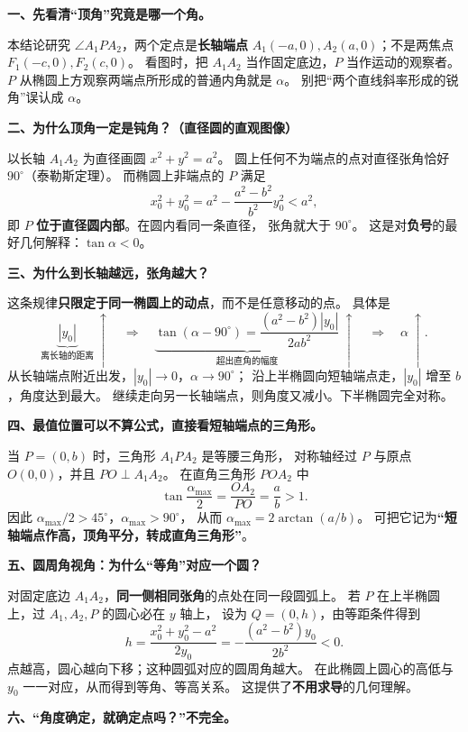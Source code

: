 \begin{explanationbox}
\textbf{一、先看清“顶角”究竟是哪一个角。}

本结论研究 $\angle A_1PA_2$，两个定点是\textbf{长轴端点}
$A_1(-a,0),A_2(a,0)$；不是两焦点 $F_1(-c,0),F_2(c,0)$。
看图时，把 $A_1A_2$ 当作固定底边，$P$ 当作运动的观察者。
$P$ 从椭圆上方观察两端点所形成的普通内角就是 $\alpha$。
别把“两个直线斜率形成的锐角”误认成 $\alpha$。

\medskip
\textbf{二、为什么顶角一定是钝角？（直径圆的直观图像）}

以长轴 $A_1A_2$ 为直径画圆 $x^2+y^2=a^2$。
圆上任何不为端点的点对直径张角恰好 $90^\circ$（泰勒斯定理）。
而椭圆上非端点的 $P$ 满足
\[
x_0^2+y_0^2=a^2-\frac{a^2-b^2}{b^2}y_0^2<a^2,
\]
即 $P$ \textbf{位于直径圆内部}。在圆内看同一条直径，
张角就大于 $90^\circ$。
这是对\textbf{负号}的最好几何解释：$\tan\alpha<0$。

\medskip
\textbf{三、为什么到长轴越远，张角越大？}

这条规律\textbf{只限定于同一椭圆上的动点}，而不是任意移动的点。
具体是
\[
\underbrace{|y_0|}_{\text{离长轴的距离}}
\ \uparrow\quad\Longrightarrow\quad
\underbrace{\tan(\alpha-90^\circ)
=\frac{(a^2-b^2)|y_0|}{2ab^2}}_{\text{超出直角的幅度}}
\ \uparrow\quad\Longrightarrow\quad\alpha\ \uparrow.
\]
从长轴端点附近出发，$|y_0|\to0$，$\alpha\to90^\circ$；
沿上半椭圆向短轴端点走，$|y_0|$ 增至 $b$，角度达到最大。
继续走向另一长轴端点，则角度又减小。下半椭圆完全对称。

\medskip
\textbf{四、最值位置可以不算公式，直接看短轴端点的三角形。}

当 $P=(0,b)$ 时，三角形 $A_1PA_2$ 是等腰三角形，
对称轴经过 $P$ 与原点 $O(0,0)$，并且 $PO\perp A_1A_2$。
在直角三角形 $POA_2$ 中
\[
\tan\frac{\alpha_{\max}}2=\frac{OA_2}{PO}=\frac ab>1.
\]
因此 $\alpha_{\max}/2>45^\circ$，$\alpha_{\max}>90^\circ$，
从而 $\alpha_{\max}=2\arctan(a/b)$。
可把它记为\textbf{“短轴端点作高，顶角平分，转成直角三角形”}。

\medskip
\textbf{五、圆周角视角：为什么“等角”对应一个圆？}

对固定底边 $A_1A_2$，\textbf{同一侧相同张角}的点处在同一段圆弧上。
若 $P$ 在上半椭圆上，过 $A_1,A_2,P$ 的圆心必在 $y$ 轴上，
设为 $Q=(0,h)$，由等距条件得到
\[
h=\frac{x_0^2+y_0^2-a^2}{2y_0}
=-\frac{(a^2-b^2)y_0}{2b^2}<0.
\]
点越高，圆心越向下移；这种圆弧对应的圆周角越大。
在此椭圆上圆心的高低与 $y_0$ 一一对应，从而得到等角、等高关系。
这提供了\textbf{不用求导}的几何理解。

\medskip
\textbf{六、“角度确定，就确定点吗？”\quad 不完全。}


\end{explanationbox}
